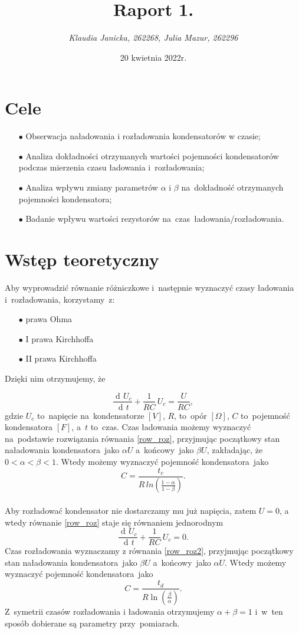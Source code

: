 \documentclass[12pt]{mwart}
\title{\textbf{Raport 1.}}
\author{\fontsize{12pt}{12pt}\selectfont \emph{Klaudia Janicka, 262268, Julia Mazur, 262296}}
\date{20 kwietnia 2022r.}
\DeclareMathOperator{\diff}{d\!}
\begin{document}
	\maketitle
	\section{Cele}
	\begin{itemize}
		\item[$\bullet$] Obserwacja naładowania i rozładowania kondensatorów w czasie;
		\item[$\bullet$] Analiza dokładności otrzymanych wartości pojemności kondensatorów podczas mierzenia czasu ładowania i~rozładowania;
		\item[$\bullet$] Analiza wpływu zmiany parametrów $\alpha$ i $\beta$ na~dokładność otrzymanych pojemności kondensatora;
		\item[$\bullet$] Badanie wpływu wartości rezystorów na~czas~ładowania/rozładowania.
	\end{itemize}
	\section{Wstęp teoretyczny}
	\noindent Aby wyprowadzić równanie różniczkowe i~następnie wyznaczyć czasy ładowania i~rozładowania, korzystamy~z:
	\begin{itemize}
		\item[$\bullet$] prawa Ohma
		\item[$\bullet$] I prawa Kirchhoffa
		\item[$\bullet$] II prawa Kirchhoffa
	\end{itemize}
	Dzięki nim otrzymujemy, że 
	
	\begin{equation}\label{row_roz}
		\frac{\diff U_{c}}{\diff t} +\frac{1}{RC}\, U_{c}=\frac{U}{RC},
	\end{equation}
	gdzie $U_{c}$ to~napięcie na~kondensatorze $\left[V\right]$, $R$, to~opór $\left[\Omega\right]$, $C$ to~pojemność kondensatora $\left[F\right]$, a~$t$ to~czas.
	Czas ładowania możemy wyznaczyć na~podstawie rozwiązania równania \eqref{row_roz}, przyjmując początkowy stan naładowania kondensatora~jako $\alpha U$ a~końcowy~jako $\beta U$, zakładając, że~$0 < \alpha < \beta < 1$. Wtedy możemy wyznaczyć pojemność kondensatora~jako $$C=\frac{t_{c}}{R\,ln\left(\frac{1-\alpha}{1-\beta}\right)}.$$\label{poj_lad}
	\phantom{a}\\
	Aby rozładować kondensator nie dostarczamy mu już napięcia, zatem $U = 0$, a wtedy równanie \eqref{row_roz} staje się równaniem jednorodnym
	\begin{equation}\label{row_roz2}
		\frac{\diff U_{c}}{\diff t} +\frac{1}{RC}\, U_{c}=0.
	\end{equation}
	Czas rozładowania wyznaczamy z równania \eqref{row_roz2}, przyjmując początkowy stan naładowania kondensatora~jako $\beta U$ a~końcowy~jako $\alpha U$. Wtedy możemy wyznaczyć pojemność kondensatora~jako
	$$C=\frac{t_d}{R\ln\left({\frac{\beta}{\alpha}}\right)}.$$
	Z~symetrii czasów rozładowania i ładowania otrzymujemy $\alpha+\beta=1$ i~w~ten sposób dobierane są parametry przy~pomiarach.
\end{document}
